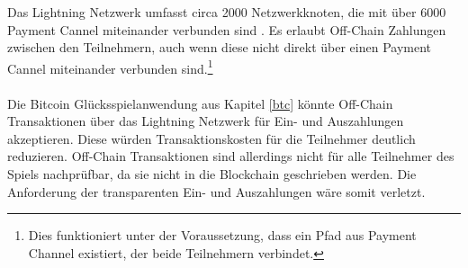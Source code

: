 Das Lightning Netzwerk umfasst circa 2000 Netzwerkknoten, die mit über 6000 Payment Cannel miteinander verbunden sind \cite{lightning_explorer}.  Es erlaubt Off-Chain Zahlungen zwischen den Teilnehmern, auch wenn diese nicht direkt über einen Payment Cannel miteinander verbunden sind.\footnote{Dies funktioniert unter der Voraussetzung, dass ein Pfad aus Payment Channel existiert, der beide Teilnehmern verbindet.} \\\\
Die Bitcoin Glücksspielanwendung aus Kapitel \ref{btc} könnte Off-Chain Transaktionen über das Lightning Netzwerk für Ein- und Auszahlungen akzeptieren. Diese würden Transaktionskosten für die Teilnehmer deutlich reduzieren. Off-Chain Transaktionen sind allerdings nicht für alle Teilnehmer des Spiels nachprüfbar, da sie nicht in die Blockchain geschrieben werden. Die Anforderung der transparenten Ein- und Auszahlungen wäre somit verletzt.